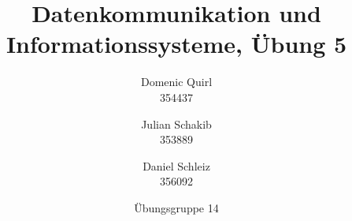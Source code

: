 \documentclass{../exercisesheet}
\title{Datenkommunikation und Informationssysteme, Übung 5}
\author{
    Domenic Quirl \\ 354437
    \and
    Julian Schakib \\ 353889
    \and 
    Daniel Schleiz \\ 356092
}
\date{Übungsgruppe 14}
\begin{document}
\maketitle
\pointtable


\begin{exercise}{4}
\begin{subexercise}

\end{subexercise}
\begin{subexercise}

\end{subexercise}
\begin{subexercise}

\end{subexercise}
\end{exercise}

\begin{exercise}{5}
\begin{subexercise}

\end{subexercise}
\begin{subexercise}

\end{subexercise}
\end{exercise}

\begin{exercise}{4}
\begin{subexercise}

\end{subexercise}
\begin{subexercise}

\end{subexercise}
\end{exercise}
\end{document}
